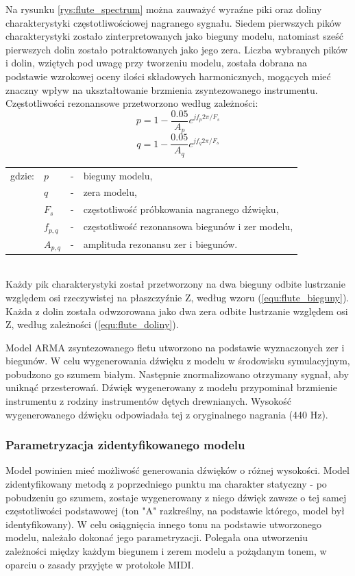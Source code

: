 Na rysunku \ref{rys:flute_spectrum} można zauważyć wyraźne piki oraz doliny charakterystyki częstotliwościowej nagranego sygnału. Siedem pierwszych pików charakterystyki zostało zinterpretowanych jako bieguny modelu, natomiast sześć pierwszych dolin zostało potraktowanych jako jego zera. Liczba wybranych pików i dolin, wziętych pod uwagę przy tworzeniu modelu, została dobrana na podstawie wzrokowej oceny ilości składowych harmonicznych, mogących mieć znaczny wpływ na ukształtowanie brzmienia zsyntezowanego instrumentu. Częstotliwości rezonansowe przetworzono według zależności:
\begin{equation} \label{equ:flute_bieguny}
p = 1-\frac{0.05}{A_{p}}e^{jf_{p}2\pi/F_{s}}
\end{equation}
\begin{equation} \label{equ:flute_doliny}
q = 1-\frac{0.05}{A_{q}}e^{jf_{q}2\pi/F_{s}}
\end{equation}
\begin{tabular}{ l l l l}
	gdzie: & $p$ &  - & bieguny modelu, \\
	&	$q$ & - &  zera modelu, \\
	&	$F_{s}$ & - &  częstotliwość próbkowania nagranego dźwięku,\\
	&	$f_{p,q}$ & - &  częstotliwość rezonansowa biegunów i zer modelu, \\
	&	$A_{p,q}$ & - &  amplituda rezonansu zer i biegunów. \\
\end{tabular} \\

Każdy pik charakterystyki został przetworzony na dwa bieguny odbite lustrzanie względem osi rzeczywistej na płaszczyźnie Z, według wzoru (\ref{equ:flute_bieguny}). Każda z dolin została odwzorowana jako dwa zera odbite lustrzanie względem osi Z, według zależności (\ref{equ:flute_doliny}).

Model ARMA zsyntezowanego fletu utworzono na podstawie wyznaczonych zer i biegunów. W celu wygenerowania dźwięku z modelu w środowisku symulacyjnym, pobudzono go szumem białym. Następnie znormalizowano otrzymany sygnał, aby uniknąć przesterowań. Dźwięk wygenerowany z modelu przypominał brzmienie instrumentu z rodziny instrumentów dętych drewnianych. Wysokość wygenerowanego dźwięku odpowiadała tej z oryginalnego nagrania (440 Hz).

\subsubsection{Parametryzacja zidentyfikowanego modelu}
Model powinien mieć możliwość generowania dźwięków o różnej wysokości. Model zidentyfikowany metodą z poprzedniego punktu ma charakter statyczny - po pobudzeniu go szumem, zostaje wygenerowany z niego dźwięk zawsze o tej samej częstotliwości podstawowej (ton "A" razkreślny, na podstawie którego, model był identyfikowany). W celu osiągnięcia innego tonu na podstawie utworzonego modelu, należało dokonać jego parametryzacji. Polegała ona utworzeniu zależności między każdym biegunem i zerem modelu a pożądanym tonem, w oparciu o zasady przyjęte w protokole MIDI.

